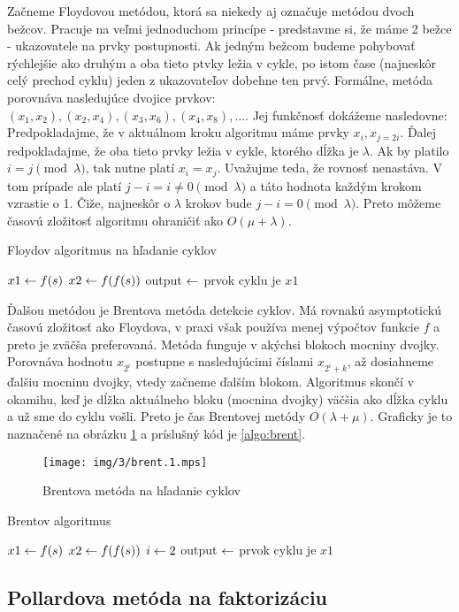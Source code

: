 Začneme Floydovou metódou, ktorá sa niekedy aj označuje metódou dvoch
bežcov. Pracuje na veľmi jednoduchom princípe - predstavme si, že máme
2 bežce - ukazovatele na prvky postupnosti. Ak jedným bežcom budeme
pohybovať rýchlejšie ako druhým a oba tieto ptvky ležia v cykle, po
istom čase (najneskôr celý prechod cyklu) jeden z ukazovateľov dobehne
ten prvý. Formálne, metóda porovnáva nasledujúce dvojice prvkov:
$(x_1,x_2), (x_2,x_4), (x_3,x_6), (x_4,x_8), \dots$.
Jej funkčnosť dokážeme nasledovne: Predpokladajme, že v aktuálnom
kroku algoritmu máme prvky $x_i, x_{j=2i}$. Ďalej redpokladajme,
že oba tieto prvky ležia v cykle, ktorého dĺžka je $\lambda$.
Ak by platilo $i = j \pmod{\lambda}$, tak nutne platí $x_i = x_j$.
Uvažujme teda, že rovnosť nenastáva. V tom prípade ale platí $j-i = i \ne
0 \pmod{\lambda}$ a táto hodnota každým krokom vzrastie o 1. Čiže,
najneskôr o $\lambda$ krokov bude $j-i = 0 \pmod{\lambda}$.
Preto môžeme časovú zložitosť algoritmu ohraničiť ako $O(\mu+\lambda)$.

\begin{algorithm}
    \label{algo:floyd}
    \caption{Floydov algoritmus na hľadanie cyklov}
    $x1 \leftarrow f(s)$\;
    $x2 \leftarrow f(f(s))$\;
    output $\leftarrow$ prvok cyklu je $x1$\;
\end{algorithm}

Ďalšou metódou je Brentova metóda detekcie cyklov. Má rovnakú
asymptotickú časovú zložitosť ako Floydova, v praxi však používa menej
výpočtov funkcie $f$ a preto je zväčša preferovaná.
Metóda funguje v akýchsi blokoch mocniny dvojky.
Porovnáva hodnotu $x_{2^i}$ postupne s nasledujúcimi číslami
$x_{2^i+k}$, až dosiahneme ďalšiu mocninu dvojky, vtedy začneme ďalším
blokom. Algoritmus skončí v okamihu, keď je dĺžka aktuálneho bloku
(mocnina dvojky) väčšia ako dĺžka cyklu a už sme do cyklu vošli.
Preto je čas Brentovej metódy $O(\lambda + \mu)$.
Graficky je to naznačené na obrázku \ref{fig:brent} a príslušný kód je
\ref{algo:brent}.

\begin{figure}[H]
    \label{fig:brent}
    \caption{Brentova metóda na hľadanie cyklov}
    \centering
    \texttt{[image: img/3/brent.1.mps]}
\end{figure}

\begin{algorithm}
    \label{algo:floyd}
    \caption{Brentov algoritmus}
    $x1 \leftarrow f(s)$\;
    $x2 \leftarrow f(f(s))$\;
    $i \leftarrow 2$\;
    output $\leftarrow$ prvok cyklu je $x1$\;
\end{algorithm}

\subsection{Pollardova metóda na faktorizáciu}
